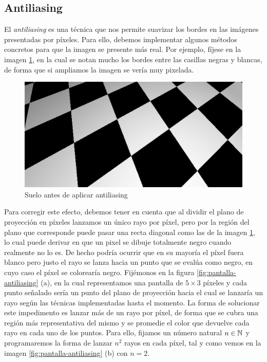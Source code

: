 \subsection{Antiliasing}

El \textit{antiliasing} es una técnica que nos permite suavizar los bordes en las imágenes presentadas por píxeles. Para ello, debemos implementar algunos métodos concretos para que la imagen se presente más real. Por ejemplo, fíjese en la imagen \ref{fig:no-antiliasing}, en la cual se notan mucho los bordes entre las casillas negras y blancas, de forma que si ampliamos la imagen se vería muy pixelada.

\begin{figure} [ht]
    \centering
    \includegraphics[scale = 0.5]{img/C8/no-antiliasing.png}
    \caption{Suelo antes de aplicar antiliasing}
    \label{fig:no-antiliasing}
\end{figure}

Para corregir este efecto, debemos tener en cuenta que al dividir el plano de proyección en píxeles lanzamos un único rayo por píxel, pero por la región del plano que corresponde puede pasar una recta diagonal como las de la imagen \ref{fig:no-antiliasing}, lo cual puede derivar en que un pixel se dibuje totalmente negro cuando realmente no lo es. De hecho podría ocurrir que en su mayoría el píxel fuera blanco pero justo el rayo se lanza hacia un punto que se evalúa como negro, en cuyo caso el píxel se colorearía negro. Fijémonos en la figura \ref{fig:pantalla-antiliasing} (a), en la cual representamos una pantalla de $5\times 3$ píxeles y cada punto señalado sería un punto del plano de proyección hacia el cual se lanzaría un rayo según las técnicas implementadas hasta el momento. La forma de solucionar este impedimento es lanzar más de un rayo por píxel, de forma que se cubra una región más representativa del mismo y se promedie el color que devuelve cada rayo en cada uno de los puntos. Para ello, fijamos un número natural $n\in\mathbb{N}$ y programaremos la forma de lanzar $n^2$ rayos en cada píxel, tal y como vemos en la imagen \ref{fig:pantalla-antiliasing} (b) con $n=2$.

